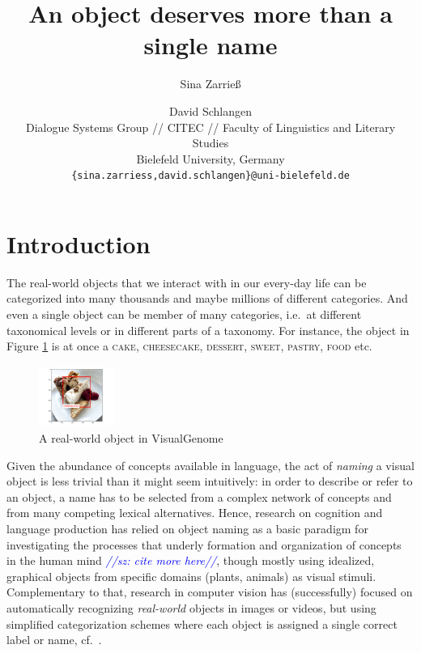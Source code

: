 \documentclass[11pt]{article}
\title{An object deserves more than a single name}
\author{Sina Zarrie{\ss}  \and David Schlangen\\
  Dialogue Systems Group // CITEC // Faculty of Linguistics and Literary Studies \\
 Bielefeld University, Germany \\
  {\tt \{sina.zarriess,david.schlangen\}@uni-bielefeld.de} \\}
\date{}
\newcommand{\sz}[1]{\textcolor{blue}{\emph{//sz: #1//}}}
\newcommand{\cat}[1]{\textsc{#1}}
\begin{document}
\maketitle

\begin{abstract}
\end{abstract}


\section{Introduction}

The real-world objects that we interact with in our every-day life can be categorized into many thousands and maybe millions of different categories. And even a single object can be member of many categories, i.e.\ at different taxonomical levels or in different parts of a taxonomy. For instance, the object in Figure \ref{fig:cake} is at once a \cat{cake}, \cat{cheesecake}, \cat{dessert}, \cat{sweet}, \cat{pastry}, \cat{food} etc.

\begin{figure}[htbp]
\begin{center}
\includegraphics[height=2cm,width=2.5cm]{Figures/cheescake.png}
\caption{A real-world object in VisualGenome}
\label{fig:cake}
\end{center}
\end{figure}


Given the abundance of concepts available in language, the act of \textit{naming} a visual object is less trivial than it might seem intuitively: in order to describe or refer to an object, a name has to be selected from a complex network of concepts and from many competing lexical alternatives.
Hence, research on cognition and language production has relied on object naming as a basic paradigm for investigating the processes that underly formation and organization of concepts in the human mind  \cite{rosch1976basic} \sz{cite more here}, though mostly using idealized, graphical objects from specific domains (plants, animals) as visual stimuli.
Complementary to that, research in computer vision has (successfully) focused on automatically recognizing \textit{real-world} objects in images or videos, but using simplified categorization schemes where each object is assigned a single correct label or name, cf.\ \cite{googlenet}. %
\end{document}
